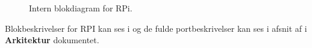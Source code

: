 \documentclass[Rapport/Rapport_main.tex]{subfiles}
\begin{document}
\begin{figure}[H]
    \centering
    \caption{Intern blokdiagram for RPi.}
    \label{fig:rap_rpi_hardware_ibd}
\end{figure}
Blokbeskrivelser for RPI kan ses i  og de fulde portbeskrivelser kan ses i afsnit  af i \textbf{Arkitektur} dokumentet. 
\end{document}
